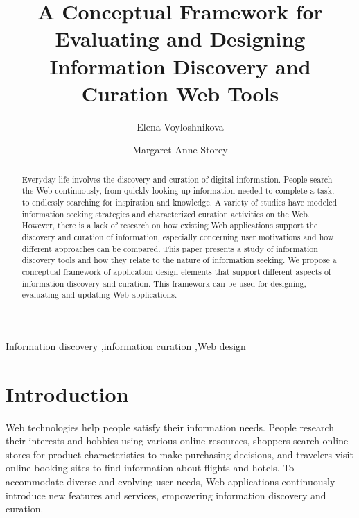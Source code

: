 \documentclass[review]{elsarticle}
\begin{document}
\begin{frontmatter}

\title{A Conceptual Framework for Evaluating and Designing Information Discovery and Curation Web Tools}


\author[elenaemail]{Elena Voyloshnikova}
\author[peggyemail]{Margaret-Anne Storey}

\address{University of Victoria}
\address{3800 Finnerty Rd, Victoria, BC, Canada, V8P 5C2}

\address[elenaemail]{elenavoy@uvic.ca}
\address[peggyemail]{mstorey@uvic.ca}





\begin{abstract}
Everyday life involves the discovery and curation of digital information. People search the Web continuously, from quickly looking up information needed to complete a task, to endlessly searching for inspiration and knowledge. A variety of studies have modeled information seeking strategies and characterized curation activities on the Web. However, there is a lack of research on how existing Web applications support the discovery and curation of information, especially concerning user motivations and how different approaches can be compared. This paper presents a study of information discovery tools and how they relate to the nature of information seeking. We propose a conceptual framework of application design elements that support different aspects of information discovery and curation. This framework can be used for designing, evaluating and updating Web applications.
\end{abstract}

\begin{keyword}
Information discovery \sep information curation \sep Web design
\end{keyword}

\end{frontmatter}

\linenumbers

\section{Introduction}

Web technologies help people satisfy their information needs. People research their interests and hobbies using various online resources, shoppers search online stores for product characteristics to make purchasing decisions, and travelers visit online booking sites to find information about flights and hotels. To accommodate diverse and evolving user needs, Web applications continuously introduce new features and services, empowering information discovery and curation. 
\end{document}
